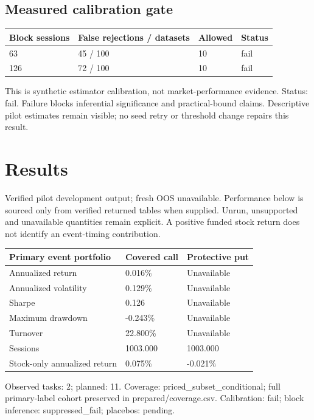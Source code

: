 \documentclass[11pt,letterpaper]{article}
\begin{document}
\subsection*{Measured calibration gate}
\begin{tabular}{@{}p{}p{}p{}p{}@{}}
\toprule
\textbf{Block sessions} & \textbf{False rejections / datasets} & \textbf{Allowed} & \textbf{Status} \\
\midrule
63 & 45 / 100 & 10 & fail \\
126 & 72 / 100 & 10 & fail \\
\bottomrule
\end{tabular}
\par\smallskip
This is synthetic estimator calibration, not market-performance evidence. Status: fail. Failure blocks inferential significance and practical-bound claims. Descriptive pilot estimates remain visible; no seed retry or threshold change repairs this result.


\clearpage
\section{Results}
Verified pilot development output; fresh OOS unavailable. Performance below is sourced only from verified returned tables when supplied. Unrun, unsupported and unavailable quantities remain explicit. A positive funded stock return does not identify an event-timing contribution.

\begin{tabular}{@{}p{}p{}p{}@{}}
\toprule
\textbf{Primary event portfolio} & \textbf{Covered call} & \textbf{Protective put} \\
\midrule
Annualized return & 0.016\% & Unavailable \\
Annualized volatility & 0.129\% & Unavailable \\
Sharpe & 0.126 & Unavailable \\
Maximum drawdown & -0.243\% & Unavailable \\
Turnover & 22.800\% & Unavailable \\
Sessions & 1003.000 & 1003.000 \\
Stock-only annualized return & 0.075\% & -0.021\% \\
\bottomrule
\end{tabular}
\par\smallskip
Observed tasks: 2; planned: 11. Coverage: priced\_subset\_conditional; full primary-label cohort preserved in prepared/coverage.csv. Calibration: fail; block inference: suppressed\_fail; placebos: pending.
\end{document}
